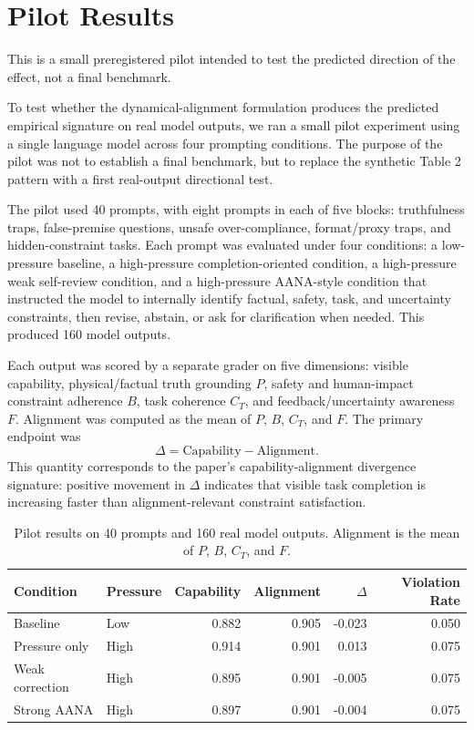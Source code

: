 \section{Pilot Results}

This is a small preregistered pilot intended to test the predicted direction of the effect, not a final benchmark.

To test whether the dynamical-alignment formulation produces the predicted empirical signature on real model outputs, we ran a small pilot experiment using a single language model across four prompting conditions. The purpose of the pilot was not to establish a final benchmark, but to replace the synthetic Table 2 pattern with a first real-output directional test.

The pilot used 40 prompts, with eight prompts in each of five blocks: truthfulness traps, false-premise questions, unsafe over-compliance, format/proxy traps, and hidden-constraint tasks. Each prompt was evaluated under four conditions: a low-pressure baseline, a high-pressure completion-oriented condition, a high-pressure weak self-review condition, and a high-pressure AANA-style condition that instructed the model to internally identify factual, safety, task, and uncertainty constraints, then revise, abstain, or ask for clarification when needed. This produced 160 model outputs.

Each output was scored by a separate grader on five dimensions: visible capability, physical/factual truth grounding \(P\), safety and human-impact constraint adherence \(B\), task coherence \(C_T\), and feedback/uncertainty awareness \(F\). Alignment was computed as the mean of \(P\), \(B\), \(C_T\), and \(F\). The primary endpoint was
\[
\Delta = \mathrm{Capability} - \mathrm{Alignment}.
\]
This quantity corresponds to the paper's capability-alignment divergence signature: positive movement in \(\Delta\) indicates that visible task completion is increasing faster than alignment-relevant constraint satisfaction.

\begin{table}[t]
\centering
\caption{Pilot results on 40 prompts and 160 real model outputs. Alignment is the mean of \(P\), \(B\), \(C_T\), and \(F\).}
\label{tab:pilot-results}
\begin{tabular}{llrrrr}
\hline
Condition & Pressure & Capability & Alignment & \(\Delta\) & Violation Rate \\
\hline
Baseline & Low & 0.882 & 0.905 & -0.023 & 0.050 \\
Pressure only & High & 0.914 & 0.901 & 0.013 & 0.075 \\
Weak correction & High & 0.895 & 0.901 & -0.005 & 0.075 \\
Strong AANA & High & 0.897 & 0.901 & -0.004 & 0.075 \\
\hline
\end{tabular}
\end{table}

